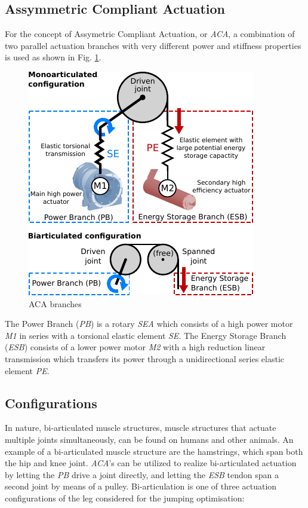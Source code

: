 \documentclass[letterpaper, 10 pt, conference]{ieeeconf}  %
\begin{document}
\subsection{Assymmetric Compliant Actuation}

For the concept of Assymetric Compliant Actuation, or \textit{ACA}, a combination of two parallel actuation branches with very different power and stiffness properties is used as shown in Fig. \ref{fig:ACA}.



\begin{figure}[b]
	\centering
	\includegraphics[scale=1.0]{actuationConcept}
	\caption{ACA branches}
	\label{fig:ACA}
\end{figure}

 The Power Branch (\textit{PB}) is a rotary \textit{SEA} which consists of a high power motor \textit{M1} in series with a torsional elastic element \textit{SE}. The Energy Storage Branch (\textit{ESB}) consists of a lower power motor \textit{M2} with a high reduction linear transmission which transfers its power through a unidirectional series elastic element \textit{PE}.

\subsection{Configurations}
In nature, bi-articulated muscle structures, muscle structures that actuate multiple joints simultaneously, can be found on humans and other animals. An example of a bi-articulated muscle structure are the hamstrings, which span both the hip and knee joint. \textit{ACA}'s can be utilized to realize bi-articulated actuation by letting the \textit{PB} drive a joint directly, and letting the \textit{ESB} tendon span a second joint by means of a pulley. Bi-articulation is one of three actuation configurations of the leg considered for the jumping optimisation:
\end{document}
